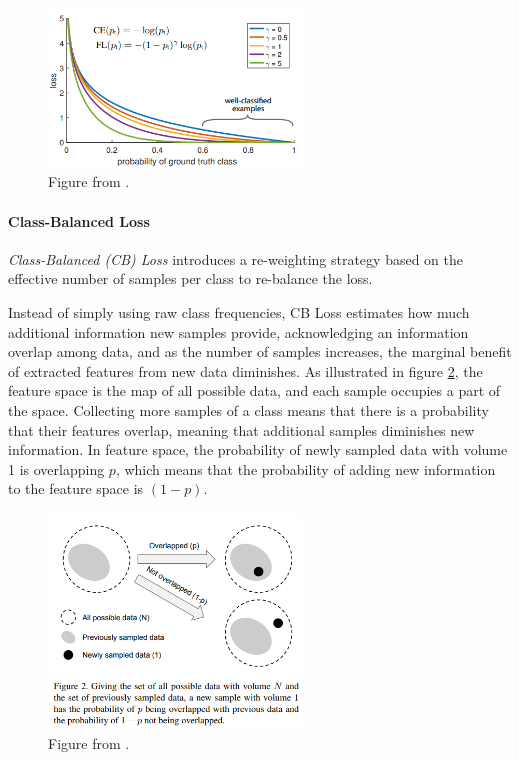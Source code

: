 \begin{figure}[h!]
    \centering
    \includegraphics[width=0.6\textwidth]{Images/focal_loss.png}
    \caption{Figure from \cite{lin2018focallossdenseobject}. }
    \label{fig:focal_loss}
\end{figure}

\paragraph{Class-Balanced Loss}
\emph{Class-Balanced (CB) Loss} \cite{cui2019classbalancedlossbasedeffective} introduces a re-weighting strategy based on the effective number of samples per class to re-balance the loss.

Instead of simply using raw class frequencies, CB Loss estimates how much additional information new samples provide, acknowledging an information overlap among data, and as the number of samples increases, the marginal benefit of extracted features from new data diminishes. As illustrated in figure \ref{fig:cb_featue_space}, the feature space is the map of all possible data, and each sample occupies a part of the space. Collecting more samples of a class means that there is a probability that their features overlap, meaning that additional samples diminishes new information.
In feature space, the probability of newly sampled data with volume 1 is overlapping $p$, which means that the probability of adding new information to the feature space is $(1-p)$. 


\begin{figure}[h!]
    \centering
    \includegraphics[width=0.6\textwidth]{Images/CB_feature_space.png}
    \caption{Figure from \cite{cui2019classbalancedlossbasedeffective}. }
    \label{fig:cb_featue_space}
\end{figure}

